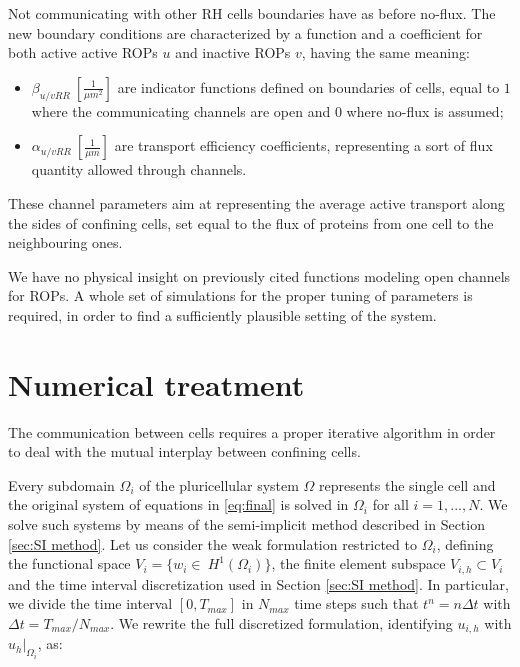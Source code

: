 Not communicating with other RH cells boundaries have as before no-flux. The new boundary conditions are characterized by a function and a coefficient for both active active ROPs $u$ and inactive ROPs $v$, having the same meaning:
\begin{itemize}
  \item $\beta_{u/v RR} \ [\frac{1}{\mu m^2}]$ are indicator functions defined on boundaries of cells, equal to $1$ where the communicating channels are open and $0$ where  no-flux is assumed;
  \item $\alpha_{u/v RR} \ [\frac{1}{\mu m}]$ are transport efficiency coefficients, representing a sort of flux quantity allowed through channels.
  \end{itemize}
These channel parameters aim at representing the average active transport along the sides of confining cells, set equal to the flux of proteins from one cell to the neighbouring ones.

We have no physical insight on previously cited functions modeling open channels for ROPs. A whole set of simulations for the proper tuning of parameters is required, in order to find a sufficiently plausible setting of the system.
\section{Numerical treatment}
The communication between cells requires a proper iterative algorithm in order to deal with the mutual interplay between confining cells.

Every subdomain $\Omega_i$ of the pluricellular system $\Omega$ represents the single cell and the original system of equations in \eqref{eq:final} is solved in $\Omega_i$ for all $i = 1, ..., N$. We solve such systems by means of the semi-implicit method described in Section \ref{sec:SI method}. Let us consider the weak formulation restricted to $\Omega_i$, defining the functional space $V_i = \{ w_i \in \ H^1\left(\Omega_i\right)\}$, the finite element subspace $V_{i,h} \subset V_i $ and the time interval discretization used in Section \ref{sec:SI method}. In particular, we divide the time interval $\left[0, T_{max}\right]$ in $N_{max}$ time steps such that $t^n = n \Delta t$ with $\Delta t = T_{max} / N_{max}  $. We rewrite the full discretized formulation, identifying $u_{i,h}$ with $u_h|_{\Omega_i}$, as:

